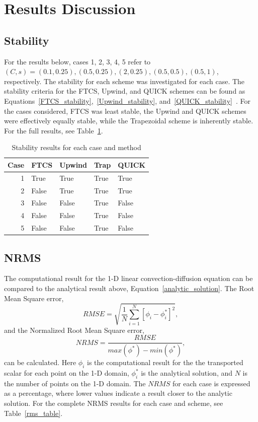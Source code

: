 \documentclass[twocolumn,10pt]{asme2ej}
\begin{document}
\section{Results Discussion}
\subsection{Stability}
For the results below, cases 1, 2, 3, 4, 5 refer to $(C, s) = (0.1, 0.25), (0.5, 0.25), (2, 0.25), (0.5, 0.5), (0.5, 1)$, respectively. The stability for each scheme was investigated for each case. The stability criteria for the FTCS, Upwind, and QUICK schemes can be found as Equations~\ref{FTCS_stability},~\ref{Upwind_stability}, and~\ref{QUICK_stability}~\cite{LectureA}. For the cases considered, FTCS was least stable, the Upwind and QUICK schemes were effectively equally stable, while the Trapezoidal scheme is inherently stable. For the full results, see Table~\ref{stability_table}.

\begin{table}[tb]
\begin{center}
\begin{tabular}{|r | l l l l|}
\hline
Case & FTCS & Upwind & Trap & QUICK  \\
\hline
1 & True  & True  & True & True  \\
2 & False & True  & True & True  \\
3 & False & False & True & False \\
4 & False & False & True & False \\
5 & False & False & True & False \\
\hline
\end{tabular}
\caption{Stability results for each case and method}
\label{stability_table}
\end{center}
\end{table}

\subsection{NRMS}
The computational result for the 1-D linear convection-diffusion equation can be compared to the analytical result above, Equation~\ref{analytic_solution}. The Root Mean Square error,
\begin{equation}
RMSE = \sqrt{\frac{1}{N}\sum\limits_{i=1}^N[\phi_i - \phi^*_i]^2},
\end{equation}
and the Normalized Root Mean Square error,
\begin{equation}
NRMS = \dfrac{RMSE}{max(\phi^*)-min(\phi^*)},
\end{equation}
can be calculated. Here $\phi_i$ is the computational result for the the transported scalar for each point on the 1-D domain, $\phi^*_i$ is the analytical solution, and $N$ is the number of points on the 1-D domain. The $NRMS$ for each case is expressed as a percentage, where lower values indicate a result closer to the analytic solution. For the complete NRMS results for each case and scheme, see Table~\ref{rms_table}.
\end{document}
